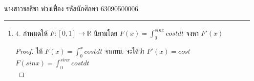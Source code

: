 \documentclass[12pt, a4paper]{article}
\begin{document}
\raggedleft นางสาวชลธิชา พ่วงเฟื่อง  รหัสนักศึกษา 63090500006 \\[12pt]
\hrule\vspace{12pt}
\raggedright

\begin{enumerate}
    \item 4. กำหนดให้ $F:[0,1]\rightarrow \mathbb{R}$ นิยามโดย $F\left ( x \right )=\int_{0}^{sin x} cos t dt$ จงหา ${F}'\left ( x \right )$\indent \\
    \begin{proof}  
        \hspace{1cm} ให้ $F\left ( x \right )=\int_{0}^{ x} cos t dt$ จากทบ. จะได้ว่า ${F}'\left ( x \right )=cos t $\\
        \hspace{2.2cm} $F\left ( sin x \right )=\int_{0}^{ sin x} cos t dt$ \\

    \end{proof}

\end{enumerate}
\end{document}
